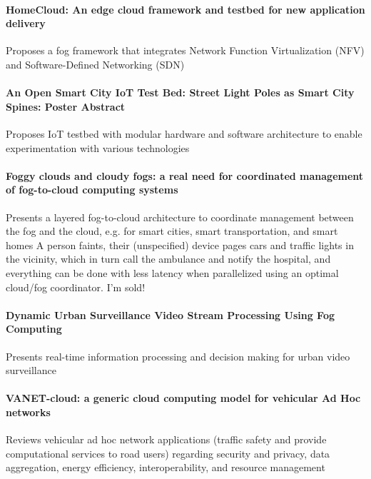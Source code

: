 \paragraph{HomeCloud: An edge cloud framework and testbed for new application delivery} \cite{pan_homecloud:_2016}
Proposes a fog framework that integrates Network Function Virtualization (NFV) and Software-Defined Networking (SDN)

\paragraph{An Open Smart City IoT Test Bed: Street Light Poles as Smart City Spines: Poster Abstract}\cite{amrutur_open_2017}
Proposes IoT testbed with modular hardware and software architecture to enable experimentation with various technologies

\paragraph{Foggy clouds and cloudy fogs: a real need for coordinated management of fog-to-cloud computing systems}\cite{masip-bruin_foggy_2016}
Presents a layered fog-to-cloud architecture to coordinate management between the fog and the cloud, e.g. for smart cities, smart transportation, and smart homes
A person faints, their (unspecified) device pages cars and traffic lights in the vicinity,
which in turn call the ambulance and notify the hospital, and everything can be done with
less latency when parallelized using an optimal cloud/fog coordinator. I'm sold!

\paragraph{Dynamic Urban Surveillance Video Stream Processing Using Fog Computing} \cite{chen_dynamic_2016}
Presents real-time information processing and decision making for urban video surveillance

\paragraph{VANET-cloud: a generic cloud computing model for vehicular Ad Hoc networks} \cite{bitam_vanet-cloud:_2015}
Reviews vehicular ad hoc network applications (traffic safety and provide computational services to road users) regarding
security and privacy, data aggregation, energy efficiency, interoperability, and resource management

